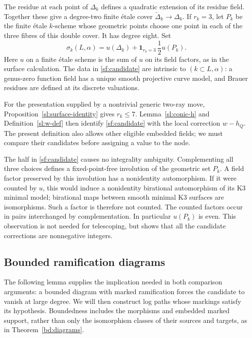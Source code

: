 The residue at each point of $\Delta_k$ defines a quadratic extension of
its residue field.  Together these give a degree-two finite \'etale cover
$\widetilde\Delta_k\to\Delta_k$.  If $r_k=3$, let $P_k$ be the finite
\'etale $k$-scheme whose geometric points choose one point in each of the
three fibres of this double cover.  It has degree eight.  Set
\begin{equation}\label{sf:candidate}
 \sigma_k(L,\alpha)
   =u(\Delta_k)+\mathbf{1}_{r_k=3}\,\frac12u(P_k).
\end{equation}
Here $u$ on a finite \'etale scheme is the sum of $u$ on its field factors,
as in the surface calculation.  The data in
\eqref{sf:candidate} are intrinsic to $(k\subset L,\alpha)$: a genus-zero
function field has a unique smooth projective curve model, and Brauer
residues are defined at its discrete valuations.

For the presentation supplied by a nontrivial generic two-ray move,
Proposition~\ref{sl:surface-identity} gives $r_k\leq7$.
Lemma~\ref{sl:conic-h} and Definition~\ref{sl:w-def} then identify
\eqref{sf:candidate} with the local correction $w-h_Q$.
The present definition also allows other eligible embedded fields;
we must compare their candidates before assigning a value to the node.

The half in \eqref{sf:candidate} causes no integrality ambiguity.
Complementing all three choices defines a fixed-point-free involution of
the geometric set $P_k$.  A field factor preserved by this involution
has a nonidentity automorphism.  If it were counted by $u$, this would
induce a nonidentity birational automorphism of its K3 minimal model;
birational maps between smooth minimal K3 surfaces are isomorphisms.
Such a factor is therefore not counted.  The counted factors occur in
pairs interchanged by complementation.  In particular $u(P_k)$ is even.
This observation is not needed for telescoping, but shows that all the
candidate corrections are nonnegative integers.

\subsection{Bounded ramification diagrams}

The following lemma supplies the implication needed in both comparison
arguments: a bounded diagram with marked ramification forces the
candidate to vanish at large degree.  We will then construct log paths
whose markings satisfy its hypothesis.  Boundedness includes the
morphisms and embedded marked support, rather than only the isomorphism
classes of their sources and targets, as in
Theorem~\ref{bd:diagrams}.

